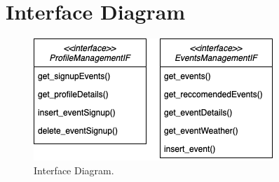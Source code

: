 \section{Interface Diagram}
\begin{figure}[h!]
	\centering
	\includegraphics[width=0.8\linewidth]{diagrammi/interfacediagram.png}
	\caption{Interface Diagram.}
	\label{fig:InterfaceDiagram}
\end{figure}